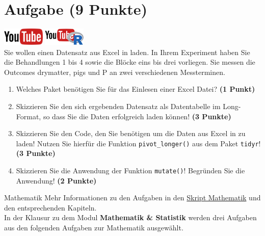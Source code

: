 \documentclass[a4paper, 10pt]{scrartcl}\usepackage[]{graphicx}\usepackage[]{xcolor}
\begin{document}
 
\clearpage

\section{Aufgabe \hfill (9 Punkte)}

\hfill\href{https://youtu.be/Oxa97uqNyCQ}{\includegraphics[width =
  2cm]{img/youtube}}
\hspace{2Ex}
\href{https://youtu.be/ymFfBkWyb8s}{\includegraphics[width =
  2cm]{img/youtube_R}}\\[1Ex]




Sie wollen einen Datensatz aus Excel in \Rlogo laden. In Ihrem Experiment haben Sie
die Behandlungen 1 bis 4 sowie die Bl{\"o}cke eins bis drei
vorliegen. Sie messen die Outcomes drymatter, pigs und P an zwei verschiedenen Messterminen.

\begin{enumerate}
\item Welches \Rlogo Paket ben{\"o}tigen Sie f{\"u}r das Einlesen einer Excel Datei?
  \textbf{(1 Punkt)} 
\item Skizzieren Sie den sich ergebenden Datensatz als Datentabelle im
  Long-Format, so dass Sie die Daten erfolgreich \Rlogo laden k{\"o}nnen!
  \textbf{(3 Punkte)}
\item Skizzieren Sie den \Rlogo Code, den Sie ben{\"o}tigen um die Daten aus
  Excel in \Rlogo zu laden! Nutzen Sie hierf{\"u}r die Funktion
  \texttt{pivot\_longer()} aus dem \Rlogo Paket \texttt{tidyr}! \textbf{(3
    Punkte)}
\item Skizzieren Sie die Anwendung der Funktion \texttt{mutate()}!
  Begr{\"u}nden Sie die Anwendung! \textbf{(2 Punkte)}
\end{enumerate}


 
\clearpage
\begin{graybox}{Mathematik}
Mehr Informationen zu den Aufgaben in den \href{https://jkruppa.github.io/math/}{Skript Mathematik} und den entsprechenden Kapiteln.\\

In der Klausur zu dem Modul \textbf{Mathematik \& Statistik} werden drei Aufgaben aus den folgenden Aufgaben zur Mathematik ausgew{\"a}hlt. \\
\end{graybox}
\clearpage
\end{document}
